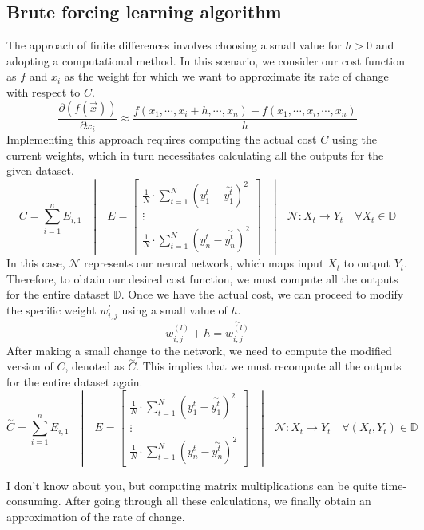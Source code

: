 \subsection{Brute forcing learning algorithm}
The approach of finite differences involves choosing a small value for $h > 0$ and adopting a
computational method. In this scenario, we consider our cost function as $f$ and $x_i$ as the weight
for which we want to approximate its rate of change with respect to $C$.
\[
\frac{\partial (f(\vec{x}))}{\partial x_i} \approx \frac{f(x_1, \cdots, x_i + h, \cdots, x_n) -
  f(x_1, \cdots, x_i, \cdots, x_n)}{h}
\]
Implementing this approach requires computing the actual cost $C$ using the current weights,
which in turn necessitates calculating all the outputs for the given dataset.
\[
C = \sum_{i = 1}^{n} E_{i, 1}
\quad | \quad
E =
\begin{bmatrix}
  \frac{1}{N} \cdot \sum_{t = 1}^{N}(y^t_{1} - \overset{\sim}{y_{1}^t})^2 \\ \vdots \\
  \frac{1}{N} \cdot \sum_{t = 1}^{N}(y^t_{n} - \overset{\sim}{y_{n}^t})^2
\end{bmatrix}
\quad | \quad \mathcal{N}: X_t \rightarrow Y_t
\quad \forall X_t \in \mathbb{D}
\]
In this case, $\mathcal{N}$ represents our neural network, which maps input $X_t$ to output $Y_t$. Therefore,
to obtain our desired cost function, we must compute all the outputs for the entire dataset
$\mathbb{D}$. Once we have the actual cost, we can proceed to modify the specific weight $w_{i, j}^l$
using a small value of $h$.
\[
w_{i, j}^{(l)} + h = \overset{\sim}{w_{i, j}^{(l)}}
\]
After making a small change to the network, we need to compute the modified version of $C$,
denoted as $\overset{\sim}{C}$. This implies that we must recompute all the outputs for the entire dataset again.
\[
\overset{\sim}{C}= \sum_{i = 1}^{n} E_{i, 1}
\quad | \quad E =
\begin{bmatrix}
  \frac{1}{N} \cdot \sum_{t = 1}^{N}(y^t_{1} - \overset{\sim}{y_{1}^t})^2 \\ \vdots \\
  \frac{1}{N} \cdot \sum_{t = 1}^{N}(y^t_{n} - \overset{\sim}{y_{n}^t})^2
\end{bmatrix}\quad | \quad \mathcal{N}: X_t \rightarrow Y_t
\quad \forall (X_t,Y_t) \in \mathbb{D}
\]

I don't know about you, but computing matrix multiplications can be quite time-consuming.
After going through all these calculations, we finally obtain an approximation of the rate of change.

